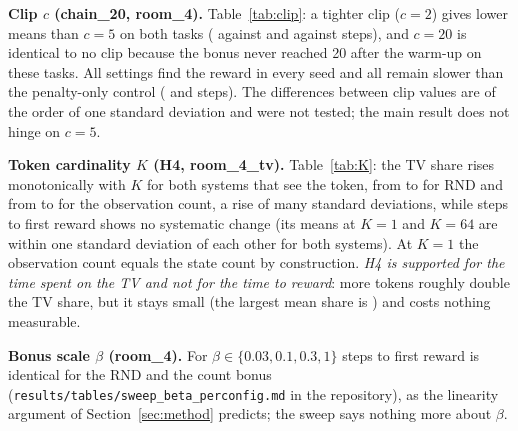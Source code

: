 \textbf{Clip $c$ (chain\_20, room\_4).} Table~\ref{tab:clip}: a tighter clip ($c=2$) gives lower means than $c=5$ on both tasks ( against  and  against  steps), and $c=20$ is identical to no clip because the bonus never reached 20 after the warm-up on these tasks. All settings find the reward in every seed and all remain slower than the penalty-only control ( and  steps). The differences between clip values are of the order of one standard deviation and were not tested; the main result does not hinge on $c=5$.

\begin{table}[!tb]\centering\caption{Clip sweep for the RND bonus (warm-up 64): steps to first reward (mean $\pm$ std over 5 seeds) and share of clipped steps. Every setting finds the reward in all five seeds. $c=5$ is the main setting; ``none'' is the warm-up-only variant.}\label{tab:clip}{\footnotesize}\end{table}

\textbf{Token cardinality $K$ (H4, room\_4\_tv).} Table~\ref{tab:K}: the TV share rises monotonically with $K$ for both systems that see the token, from  to  for RND and from  to  for the observation count, a rise of many standard deviations, while steps to first reward shows no systematic change (its means at $K=1$ and $K=64$ are within one standard deviation of each other for both systems). At $K=1$ the observation count equals the state count by construction. \emph{H4 is supported for the time spent on the TV and not for the time to reward}: more tokens roughly double the TV share, but it stays small (the largest mean share is ) and costs nothing measurable.

\begin{table}[!tb]\centering\caption{Sweep over the TV token cardinality $K$ on room\_4\_tv (mean $\pm$ std over 5 seeds): steps to first reward and TV share for RND and the observation count (Cnt). $K=16$ is the main setting.}\label{tab:K}\resizebox{\columnwidth}{!}{\footnotesize\setlength{\tabcolsep}{3pt}}\end{table}

\textbf{Bonus scale $\beta$ (room\_4).} For $\beta\in\{0.03,0.1,0.3,1\}$ steps to first reward is identical for the RND and the count bonus (\texttt{results/tables/sweep\_beta\_perconfig.md} in the repository), as the linearity argument of Section~\ref{sec:method} predicts; the sweep says nothing more about $\beta$.
